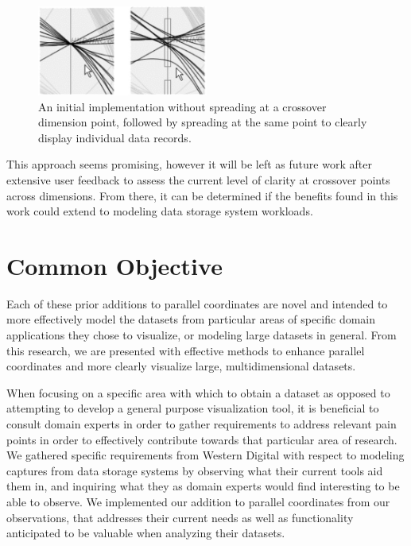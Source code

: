 \documentclass[12pt]{ucthesis}
\begin{document}
\begin{figure}[h!]
 \centering
 \includegraphics[width=0.5\textwidth]{images/spread.jpg}
 \caption[Spreading at a crossover point to display individual data records.]{An initial implementation without spreading at a crossover dimension point, followed by spreading at the same point to clearly display individual data records.}
 \label{fig:curves2}
\end{figure}

This approach seems promising, however it will be left as future work after extensive user feedback to assess the current level of clarity at crossover points across dimensions. From there, it can be determined if the benefits found in this work could extend to modeling data storage system workloads.

\section{Common Objective}
\label{common_objective}
Each of these prior additions to parallel coordinates are novel and intended to more effectively model the datasets from particular areas of specific domain applications they chose to visualize, or modeling large datasets in general. From this research, we are presented with effective methods to enhance parallel coordinates and more clearly visualize large, multidimensional datasets.

When focusing on a specific area with which to obtain a dataset as opposed to attempting to develop a general purpose visualization tool, it is beneficial to consult domain experts in order to gather requirements to address relevant pain points in order to effectively contribute towards that particular area of research. We gathered specific requirements from Western Digital with respect to modeling captures from data storage systems by observing what their current tools aid them in, and inquiring what they as domain experts would find interesting to be able to observe. We implemented our addition to parallel coordinates from our observations, that addresses their current needs as well as functionality anticipated to be valuable when analyzing their datasets.
\end{document}

